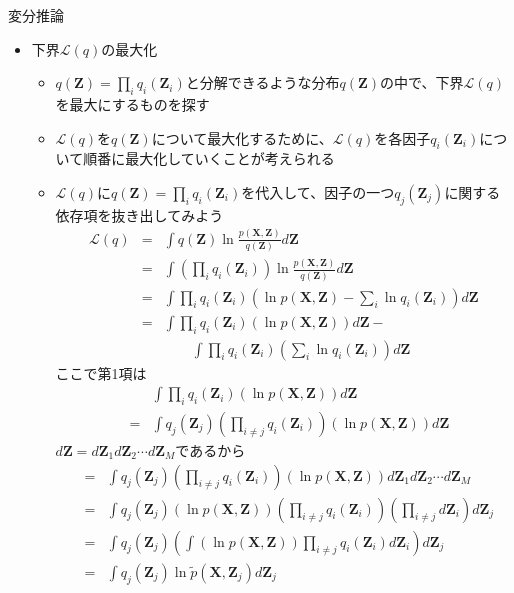 \documentclass[dvipdfmx,notheorems,t]{beamer}
\begin{document}
\begin{frame}{変分推論}

\begin{itemize}
	\item 下界$\mathcal{L}(q)$の最大化
	\begin{itemize}
		\item $q(\bm{Z}) = \prod_i q_i(\bm{Z}_i)$と分解できるような分布$q(\bm{Z})$の中で、\color{red}下界$\mathcal{L}(q)$を最大にするもの\normalcolor を探す
		\newline
		\item $\mathcal{L}(q)$を$q(\bm{Z})$について最大化するために、$\mathcal{L}(q)$を各因子$q_i(\bm{Z}_i)$について\color{red}順番に最大化\normalcolor していくことが考えられる
		\item $\mathcal{L}(q)$に$q(\bm{Z}) = \prod_i q_i(\bm{Z}_i)$を代入して、因子の一つ$q_j(\bm{Z}_j)$に関する\alert{依存項}を抜き出してみよう
		\begin{eqnarray}
			\mathcal{L}(q) &=& \int q(\bm{Z}) \ln \frac{p(\bm{X}, \bm{Z})}{q(\bm{Z})} d\bm{Z} \\
			&=& \int \left( \prod_i q_i(\bm{Z}_i) \right) \ln \frac{p(\bm{X}, \bm{Z})}{q(\bm{Z})} d\bm{Z} \\
			&=& \int \prod_i q_i(\bm{Z}_i) \left( \ln p(\bm{X}, \bm{Z}) - \sum_i \ln q_i(\bm{Z}_i) \right) d\bm{Z} \\
			&=& \int \prod_i q_i(\bm{Z}_i) \left( \ln p(\bm{X}, \bm{Z}) \right) d\bm{Z} - \nonumber \\
			&& \qquad \int \prod_i q_i(\bm{Z}_i) \left( \sum_i \ln q_i(\bm{Z}_i) \right) d\bm{Z}
		\end{eqnarray}
		ここで第1項は
		\begin{eqnarray}
			&& \int \prod_i q_i(\bm{Z}_i) \left( \ln p(\bm{X}, \bm{Z}) \right) d\bm{Z} \nonumber \\
			&=& \int q_j(\bm{Z}_j) \left( \prod_{i \neq j} q_i(\bm{Z}_i) \right) \left( \ln p(\bm{X}, \bm{Z}) \right) d\bm{Z}
		\end{eqnarray}
		$d\bm{Z} = d\bm{Z}_1 d\bm{Z}_2 \cdots d\bm{Z}_M$であるから
		\begin{eqnarray}
			&=& \int q_j(\bm{Z}_j) \left( \prod_{i \neq j} q_i(\bm{Z}_i) \right) \left( \ln p(\bm{X}, \bm{Z}) \right) d\bm{Z}_1 d\bm{Z}_2 \cdots d\bm{Z}_M \\
			&=& \int q_j(\bm{Z}_j) \left( \ln p(\bm{X}, \bm{Z}) \right) \left( \prod_{i \neq j} q_i(\bm{Z}_i) \right) \left( \prod_{i \neq j} d\bm{Z}_i \right) d\bm{Z}_j \\
			&=& \int q_j(\bm{Z}_j) \left( \int \left( \ln p(\bm{X}, \bm{Z}) \right) \prod_{i \neq j} q_i(\bm{Z}_i) d\bm{Z}_i \right) d\bm{Z}_j \\
			&=& \int q_j(\bm{Z}_j) \ln \widetilde{p}(\bm{X}, \bm{Z}_j) d\bm{Z}_j
		\end{eqnarray}
		

\end{itemize}
\end{itemize}
\end{frame}
\end{document}
